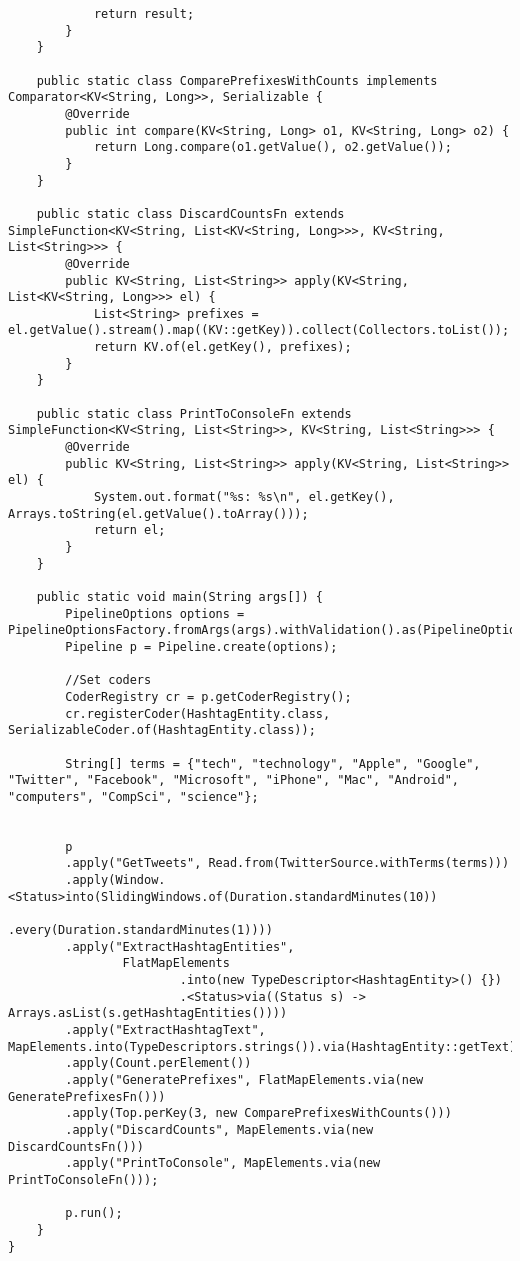 \begin{codelisting}
\begin{verbatim}
            return result;
        }
    }

    public static class ComparePrefixesWithCounts implements Comparator<KV<String, Long>>, Serializable {
        @Override
        public int compare(KV<String, Long> o1, KV<String, Long> o2) {
            return Long.compare(o1.getValue(), o2.getValue());
        }
    }

    public static class DiscardCountsFn extends SimpleFunction<KV<String, List<KV<String, Long>>>, KV<String, List<String>>> {
        @Override
        public KV<String, List<String>> apply(KV<String, List<KV<String, Long>>> el) {
            List<String> prefixes = el.getValue().stream().map((KV::getKey)).collect(Collectors.toList());
            return KV.of(el.getKey(), prefixes);
        }
    }

    public static class PrintToConsoleFn extends SimpleFunction<KV<String, List<String>>, KV<String, List<String>>> {
        @Override
        public KV<String, List<String>> apply(KV<String, List<String>> el) {
            System.out.format("%s: %s\n", el.getKey(), Arrays.toString(el.getValue().toArray()));
            return el;
        }
    }

    public static void main(String args[]) {
        PipelineOptions options = PipelineOptionsFactory.fromArgs(args).withValidation().as(PipelineOptions.class);
        Pipeline p = Pipeline.create(options);

        //Set coders
        CoderRegistry cr = p.getCoderRegistry();
        cr.registerCoder(HashtagEntity.class, SerializableCoder.of(HashtagEntity.class));

        String[] terms = {"tech", "technology", "Apple", "Google", "Twitter", "Facebook", "Microsoft", "iPhone", "Mac", "Android", "computers", "CompSci", "science"};


        p
        .apply("GetTweets", Read.from(TwitterSource.withTerms(terms)))
        .apply(Window.<Status>into(SlidingWindows.of(Duration.standardMinutes(10))
                                                 .every(Duration.standardMinutes(1))))
        .apply("ExtractHashtagEntities",
                FlatMapElements
                        .into(new TypeDescriptor<HashtagEntity>() {})
                        .<Status>via((Status s) -> Arrays.asList(s.getHashtagEntities())))
        .apply("ExtractHashtagText", MapElements.into(TypeDescriptors.strings()).via(HashtagEntity::getText))
        .apply(Count.perElement())
        .apply("GeneratePrefixes", FlatMapElements.via(new GeneratePrefixesFn()))
        .apply(Top.perKey(3, new ComparePrefixesWithCounts()))
        .apply("DiscardCounts", MapElements.via(new DiscardCountsFn()))
        .apply("PrintToConsole", MapElements.via(new PrintToConsoleFn()));

        p.run();
    }
}
\end{verbatim}
\end{codelisting}
